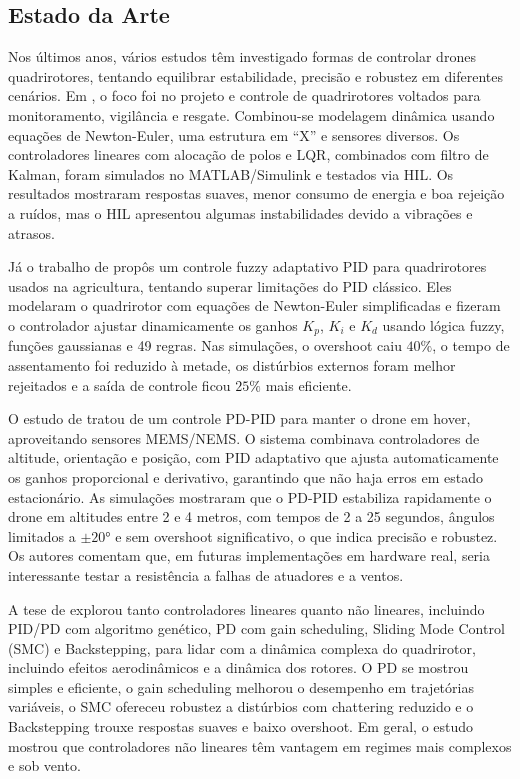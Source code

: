 \subsection{Estado da Arte}
Nos últimos anos, vários estudos têm investigado formas de controlar drones quadrirotores, tentando equilibrar estabilidade, precisão e robustez em diferentes cenários. Em \cite{usp}, o foco foi no projeto e controle de quadrirotores voltados para monitoramento, vigilância e resgate. Combinou-se modelagem dinâmica usando equações de Newton-Euler, uma estrutura em ``X'' e sensores diversos. Os controladores lineares com alocação de polos e LQR, combinados com filtro de Kalman, foram simulados no MATLAB/Simulink e testados via HIL. Os resultados mostraram respostas suaves, menor consumo de energia e boa rejeição a ruídos, mas o HIL apresentou algumas instabilidades devido a vibrações e atrasos.

Já o trabalho de \cite{he} propôs um controle fuzzy adaptativo PID para quadrirotores usados na agricultura, tentando superar limitações do PID clássico. Eles modelaram o quadrirotor com equações de Newton-Euler simplificadas e fizeram o controlador ajustar dinamicamente os ganhos $K_p$, $K_i$ e $K_d$ usando lógica fuzzy, funções gaussianas e 49 regras. Nas simulações, o overshoot caiu $40\%$, o tempo de assentamento foi reduzido à metade, os distúrbios externos foram melhor rejeitados e a saída de controle ficou $25\%$ mais eficiente.

O estudo de \cite{memon} tratou de um controle PD-PID para manter o drone em hover, aproveitando sensores MEMS/NEMS. O sistema combinava controladores de altitude, orientação e posição, com PID adaptativo que ajusta automaticamente os ganhos proporcional e derivativo, garantindo que não haja erros em estado estacionário. As simulações mostraram que o PD-PID estabiliza rapidamente o drone em altitudes entre 2 e 4 metros, com tempos de 2 a 25 segundos, ângulos limitados a $\pm20°$ e sem overshoot significativo, o que indica precisão e robustez. Os autores comentam que, em futuras implementações em hardware real, seria interessante testar a resistência a falhas de atuadores e a ventos.

A tese de \cite{elkholy} explorou tanto controladores lineares quanto não lineares, incluindo PID/PD com algoritmo genético, PD com gain scheduling, Sliding Mode Control (SMC) e Backstepping, para lidar com a dinâmica complexa do quadrirotor, incluindo efeitos aerodinâmicos e a dinâmica dos rotores. O PD se mostrou simples e eficiente, o gain scheduling melhorou o desempenho em trajetórias variáveis, o SMC ofereceu robustez a distúrbios com chattering reduzido e o Backstepping trouxe respostas suaves e baixo overshoot. Em geral, o estudo mostrou que controladores não lineares têm vantagem em regimes mais complexos e sob vento.

